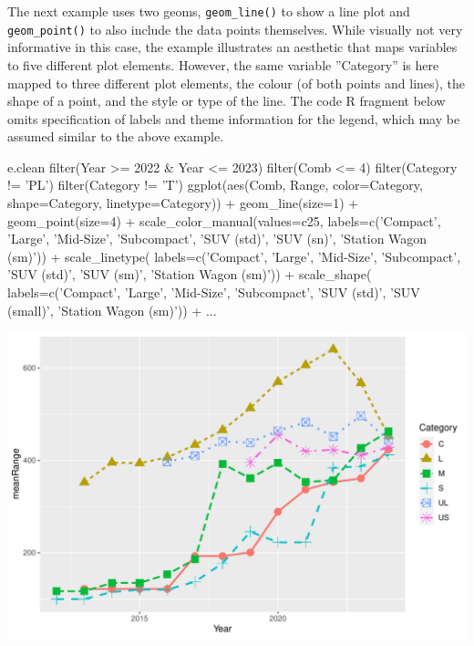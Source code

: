 The next example uses two geoms, \texttt{geom\_line()} to show a line plot and \texttt{geom\_point()} to also include the data points themselves. While visually not very informative in this case, the example illustrates an aesthetic that maps variables to five different plot elements. However, the same variable ''Category'' is here mapped to three different plot elements, the colour (of both points and lines), the shape of a point, and the style or type of the line. The code R fragment below omits specification of labels and theme information for the legend, which may be assumed similar to the above example.  

\begin{samepage}
\begin{Rcode}
e.clean %
  filter(Year >= 2022 & Year <= 2023) %
  filter(Comb <= 4) %
  filter(Category != 'PL') %
  filter(Category != 'T') %
ggplot(aes(Comb, Range, 
           color=Category, 
           shape=Category, 
           linetype=Category)) +
  geom_line(size=1) + 
  geom_point(size=4) + 
  scale_color_manual(values=c25, 
    labels=c('Compact', 'Large', 'Mid-Size', 
             'Subcompact', 'SUV (std)', 
             'SUV (sn)', 'Station Wagon (sm)')) + 
  scale_linetype(
    labels=c('Compact', 'Large', 'Mid-Size', 
             'Subcompact', 'SUV (std)', 
             'SUV (sm)', 'Station Wagon (sm)')) + 
  scale_shape(
    labels=c('Compact', 'Large', 'Mid-Size', 
             'Subcompact', 'SUV (std)', 
             'SUV (small)', 'Station Wagon (sm)')) + 
...
\end{Rcode}
\end{samepage}

\begin{center}
  \includegraphics[width=.8\textwidth]{fuel.linesPoints.pdf}
\end{center}

